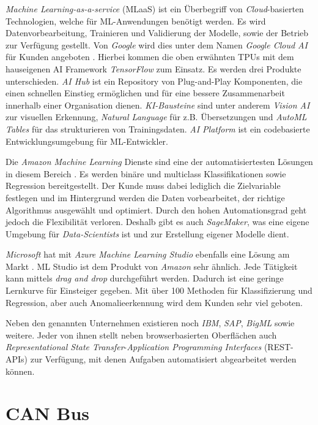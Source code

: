 \textit{Machine Learning-as-a-service} (MLaaS) ist ein Überbegriff von \textit{Cloud}-basierten Technologien, welche für ML-Anwendungen benötigt werden. Es wird Datenvorbearbeitung, Trainieren und Validierung der Modelle, sowie der Betrieb zur Verfügung gestellt. Von \textit{Google} wird dies unter dem Namen \textit{Google Cloud AI} für Kunden angeboten \cite{Google2020}. Hierbei kommen die oben erwähnten TPUs mit dem hauseigenen AI Framework \textit{TensorFlow} zum Einsatz. Es werden drei Produkte unterschieden. \textit{AI Hub} ist ein Repository von Plug-and-Play Komponenten, die einen schnellen Einstieg ermöglichen und für eine bessere Zusammenarbeit innerhalb einer Organisation dienen. \textit{KI-Bausteine} sind unter anderem \textit{Vision AI} zur visuellen Erkennung, \textit{Natural Language} für z.B. Übersetzungen und \textit{AutoML Tables} für das strukturieren von Trainingsdaten. \textit{AI Platform} ist ein codebasierte Entwicklungsumgebung für ML-Entwickler.

Die \textit{Amazon Machine Learning} Dienste sind eine der automatisiertesten Lösungen in diesem Bereich \cite{Amazon2020}. Es werden binäre und multiclass Klassifikationen sowie Regression bereitgestellt. Der Kunde muss dabei lediglich die Zielvariable festlegen und im Hintergrund werden die Daten vorbearbeitet, der richtige Algorithmus ausgewählt und optimiert. Durch den hohen Automationsgrad geht jedoch die Flexibilität verloren. Deshalb gibt es auch \textit{SageMaker}, was eine eigene Umgebung für \textit{Data-Scientists} ist und zur Erstellung eigener Modelle dient.

\textit{Microsoft} hat mit \textit{Azure Machine Learning Studio} ebenfalls eine Lösung am Markt \cite{MS2020}. ML Studio ist dem Produkt von \textit{Amazon} sehr ähnlich. Jede Tätigkeit kann mittels \textit{drag and drop} durchgeführt werden. Dadurch ist eine geringe Lernkurve für Einsteiger gegeben. Mit über 100 Methoden für Klassifizierung und Regression, aber auch Anomalieerkennung wird dem Kunden sehr viel geboten.

Neben den genannten Unternehmen existieren noch \textit{IBM}, \textit{SAP}, \textit{BigML} sowie weitere. Jeder von ihnen stellt neben browserbasierten Oberflächen auch \textit{Representational State Transfer}-\textit{Application Programming Interfaces} (REST-APIs) zur Verfügung, mit denen Aufgaben automatisiert abgearbeitet werden können.

\section{CAN Bus}
\label{sec:can_bus}

